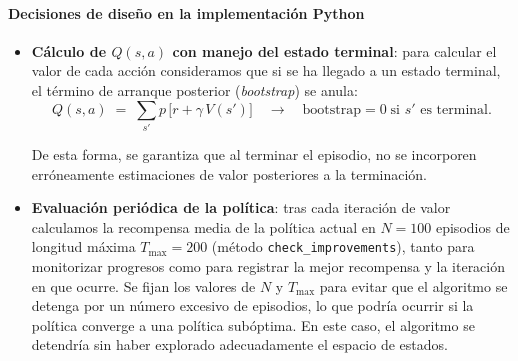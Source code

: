 \paragraph*{Decisiones de diseño en la implementación Python}
\begin{itemize}
  \item \textbf{Cálculo de $Q(s,a)$ con manejo del estado terminal}: para calcular el valor de cada acción consideramos que si se ha llegado a un estado terminal, el término de arranque posterior (\emph{bootstrap}) se anula:
  \[
    Q(s,a) \;=\; \sum_{s'} p\,\bigl[r + \gamma\,V(s')\bigr]
    \quad\longrightarrow\quad
    \text{bootstrap}=0\;\text{si }s'\text{ es terminal.}
  \]

  De esta forma, se garantiza que al terminar el episodio, no se incorporen erróneamente estimaciones de valor posteriores a la terminación.

  \item \textbf{Evaluación periódica de la política}: tras cada iteración de valor calculamos la recompensa media de la política actual en $N=100$ episodios de longitud máxima $T_{\max}=200$ (método \texttt{check\_improvements}), tanto para monitorizar progresos como para registrar la mejor recompensa y la iteración en que ocurre. Se fijan los valores de $N$ y $T_{\max}$ para evitar que el algoritmo se detenga por un número excesivo de episodios, lo que podría ocurrir si la política converge a una política subóptima. En este caso, el algoritmo se detendría sin haber explorado adecuadamente el espacio de estados.
\end{itemize}